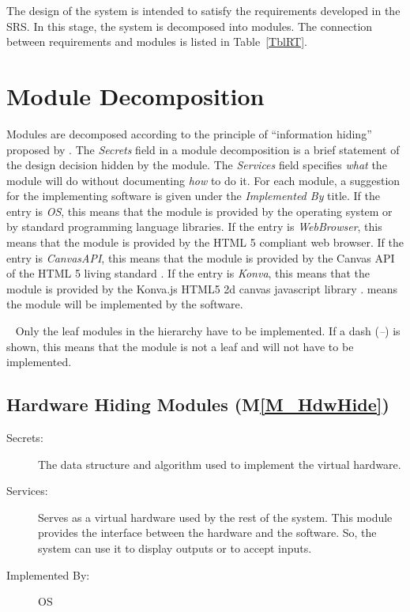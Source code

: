 \documentclass[12pt, titlepage]{article}
\newcommand{\mref}[1]{M\ref{#1}}
\begin{document}
The design of the system is intended to satisfy the requirements developed in
the SRS. In this stage, the system is decomposed into modules. The connection
between requirements and modules is listed in Table~\ref{TblRT}.

\section{Module Decomposition} \label{SecMD}

Modules are decomposed according to the principle of ``information hiding''
proposed by \citet{ParnasEtAl1984}. The \emph{Secrets} field in a module
decomposition is a brief statement of the design decision hidden by the
module. The \emph{Services} field specifies \emph{what} the module will do
without documenting \emph{how} to do it. For each module, a suggestion for the
implementing software is given under the \emph{Implemented By} title. If the
entry is \emph{OS}, this means that the module is provided by the operating
system or by standard programming language libraries.
If the entry is \emph{WebBrowser}, this means that the module is provided by the 
HTML 5 compliant web browser.
If the entry is \emph{CanvasAPI}, this means that the module is provided by the 
Canvas API of the HTML 5 living standard \cite{html_std_canvas}.
If the entry is \emph{Konva}, this means that the module is provided by the 
Konva.js HTML5 2d canvas javascript library \cite{konva_2021}.
\emph{\progname{}} means the module will be implemented by the \progname{} software.

~\newline
Only the leaf modules in the hierarchy have to be implemented. If a dash
(\emph{--}) is shown, this means that the module is not a leaf and will not have
to be implemented.

\subsection{Hardware Hiding Modules (\mref{M_HdwHide})}

\begin{description}
\item[Secrets:]The data structure and algorithm used to implement the virtual
  hardware.
\item[Services:]Serves as a virtual hardware used by the rest of the
  system. This module provides the interface between the hardware and the
  software. So, the system can use it to display outputs or to accept inputs.
\item[Implemented By:] OS
\end{description}
\end{document}
